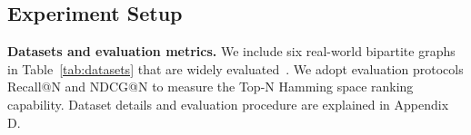 \subsection{\textbf{Experiment Setup}}
\label{sec:exp_setup}

\textbf{Datasets and evaluation metrics.} 
We include six real-world bipartite graphs in Table~\ref{tab:datasets} that are widely evaluated~\cite{lightgcn,chen2021hyper,chen2021attentive,yang2022hrcf,ngcf,zhang2022knowledge}.
We adopt evaluation protocols Recall@N and NDCG@N to measure the Top-N Hamming space ranking capability.
Dataset details and evaluation procedure are explained in Appendix D.




\begin{table}[t]
\centering
\small
\caption{The statistics of datasets.}
\vspace{-0.15in}
\label{tab:datasets}
\end{table}



